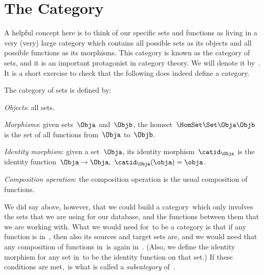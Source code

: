 

\section{The Category \Set}

A helpful concept here is to think of our specific sets and functions as living in a very (very) large category which contains all possible sets as its objects and all possible functions as its morphisms. This category is known as the category of sets, and it is an important protagonist in category theory. We will denote it by~\Set. It is a short exercise to check that the following does indeed define a category.

\begin{ctdefinition}
  \label{def:Set}
  The category of sets \iindex{\Set} is defined by:
  \begin{compactenum}
    \item \emph{Objects}: all sets.
    \item \emph{Morphisms}: given sets~$\Obja$ and~$\Objb$, the homset~$\HomSet\Set \Obja \Objb$ is the set of all functions from~$\Obja$ to~$\Objb$.
    \item \emph{Identity morphism}: given a set~$\Obja$, its identity morphism~$\catid_\Obja$ is the identity function~$\Obja \to \Obja, \ \catid_\Obja(\obja) = \obja$.
    \item \emph{Composition operation}: the composition operation is the usual composition of functions.
  \end{compactenum}
\end{ctdefinition}

We did say above, however, that we could build a category~\Database which only involves the sets that we are using for our database, and the functions between them that we are working with. What we would need for~\Database to be a category is that if any function is in~\Database, then also its sources and target sets are, and we would need that any composition of functions in~\Database is again in~\Database. (Also, we define the identity morphism for any set in~\Database to be the identity function on that set.) If these conditions are met,~\Database is what is called a \emph{subcategory} of~\Set.
